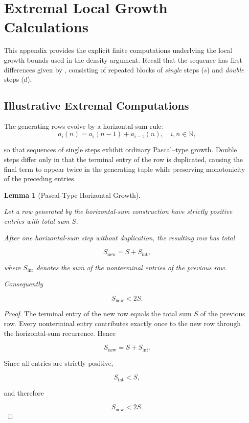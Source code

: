 \documentclass[12pt, oneside]{article}
\numberwithin{equation}{section}
\theoremstyle{definition}
\theoremstyle{plain}
\newtheorem{lemma}[theorem]{Lemma}
\theoremstyle{remark}
\begin{document}
\section{Extremal Local Growth Calculations}
\label{app:local-growth-details}

This appendix provides the explicit finite computations underlying the local
growth bounds used in the density argument. Recall that the sequence 
has first differences given by , consisting of repeated blocks of
\emph{single} steps ($s$) and \emph{double} steps ($d$).

\subsection{Illustrative Extremal Computations}

The generating rows evolve by a horizontal-sum rule:
\begin{equation}
a_i(n) = a_i(n-1) + a_{i-1}(n), \quad i,n \in \mathbb{N},
\end{equation}

so that sequences of single steps exhibit ordinary Pascal--type growth.
Double steps differ only in that the terminal entry of the row is duplicated,
causing the final term to appear twice in the generating tuple while preserving
monotonicity of the preceding entries.

\begin{lemma}[Pascal-Type Horizontal Growth]
\label{lem:pascal-growth}

Let a row generated by the horizontal-sum construction have strictly positive entries
with total sum $S$.

After one horizontal-sum step without duplication, the resulting row has total

\[
S_{\mathrm{new}}
=
S+S_{\mathrm{int}},
\]

where $S_{\mathrm{int}}$ denotes the sum of the nonterminal entries of the
previous row.

Consequently

\[
S_{\mathrm{new}} < 2S.
\]

\end{lemma}

\begin{proof}

The terminal entry of the new row equals the total sum $S$ of the previous row.
Every nonterminal entry contributes exactly once to the new row through the
horizontal-sum recurrence. Hence

\[
S_{\mathrm{new}}
=
S+S_{\mathrm{int}}.
\]

Since all entries are strictly positive,

\[
S_{\mathrm{int}}<S,
\]

and therefore

\[
S_{\mathrm{new}}<2S.
\]

\end{proof}
\end{document}
